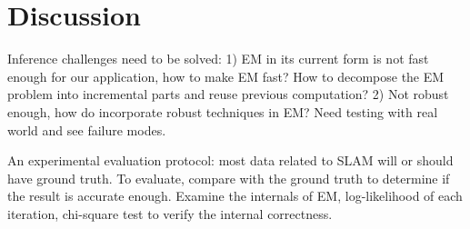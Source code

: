 \section{Discussion}

Inference challenges need to be solved: 1) EM in its current form is not fast enough for our application, how to make EM fast? How to decompose the EM problem into incremental parts and reuse previous computation? 2) Not robust enough, how do incorporate robust techniques in EM? Need testing with real world and see failure modes.

An experimental evaluation protocol: most data related to SLAM will or should have ground truth. To evaluate, compare with the ground truth to determine if  the result is accurate enough. Examine the internals of EM, log-likelihood of each iteration, chi-square test to verify the internal correctness.
